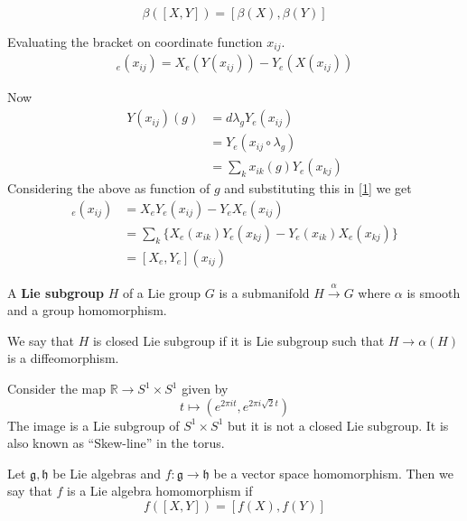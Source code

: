 \documentclass[11pt,a4paper]{scrarticle}
\theoremstyle{definition}
\renewenvironment{proof}[1][\proofname]{\vspace{-15pt}\begin{myproof}}{\end{myproof}}
\theoremstyle{greenbox}
\newcommand{\R}{\mathbb{R}}
\begin{document}
    \begin{lemma}
        
        \[ \beta ([X,Y]) = [\beta(X),\beta(Y)] \]
        
    \end{lemma}
    \begin{proof}
        Evaluating the bracket on coordinate function $ x_{ij} $. \begin{align}
            [X,Y]_{e}(x_{ij}) = X_{e}(Y(x_{ij})) - Y_{e}(X(x_{ij})) \label{1}
        \end{align}

        Now \begin{align*}
            Y(x_{ij})(g) & = d \lambda_{g} Y_{e}(x_{ij}) \\
            & = Y_{e}(x_{ij} \circ \lambda_{g}) \\
            & = \sum_{k}^{} x_{ik}(g)Y_{e}(x_{kj}) 
        \end{align*}
        Considering the above as function of $ g $ and substituting this in \cref{1} we get \begin{align*}
            [X,Y]_{e}(x_{ij}) & = X_{e}Y_{e}(x_{ij}) - Y_{e}X_{e}(x_{ij}) \\
            & = \sum_{k} \{X_{e}(x_{ik})Y_{e}(x_{kj}) -  Y_{e}(x_{ik})X_{e}(x_{kj})\} \\
            & = [X_{e},Y_{e}](x_{ij})
        \end{align*}
    \end{proof}
    \begin{defn}
        A \textbf{Lie subgroup} $ H $ of a Lie group $ G $ is a submanifold $ H \xrightarrow{\alpha} G $ where $ \alpha $ is smooth and a group homomorphism. 
    \end{defn}
    We say that $ H $ is closed Lie subgroup if it is Lie subgroup such that $ H \to \alpha(H) $ is a diffeomorphism.
    \begin{example}
        Consider the map $ \R \to S^{1} \times S^{1} $ given by 
        \[ t \mapsto (e^{2 \pi it}, e^{2 \pi i \sqrt{2}t}) \]
        The image is a Lie subgroup of $ S^{1} \times S^{1} $ but it is not a closed Lie subgroup. It is also known as ``Skew-line'' in the torus. 
    \end{example}
    \begin{defn}
        Let $ \mathfrak{g}, \mathfrak{h} $ be Lie algebras and $ f: \mathfrak{g} \to \mathfrak{h} $ be a vector space homomorphism. Then we say that $ f $ is a Lie algebra homomorphism if 
    \[ f([X,Y]) = [f(X),f(Y)] \]
    \end{defn}
\end{document}
